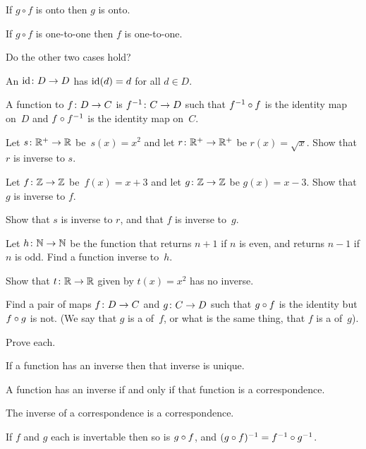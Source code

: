 \documentclass{ibl}
\begin{document}
\begin{ex} 
\begin{exes}
\item If $g\circ f$ is onto then $g$ is onto.
\item If $g\circ f$ is one-to-one then $f$ is one-to-one.
\item Do the other two cases hold?     
\end{exes}
\end{ex}

\begin{df}
An  $\mbox{$\operatorname{id}\colon D\to D$}$ has
$\operatorname{id}(d)=d$ for all $d\in D$.
\end{df}

\begin{df}
A function  to $\mbox{$f\colon D\to C$}$ is 
$\mbox{$f^{-1}\colon C\to D$}$ such that 
$f^{-1}\mathbin{\circ} f$ is the identity map on~$D$ and
$f\mathbin{\circ} f^{-1}$ is the identity map on~$C$.
\end{df}

\begin{ex} 
\begin{exes}
\item Let $\mbox{$s\colon \mathbb{R}^+\to \mathbb{R}$}$ be~$s(x)=x^2$ and let
  $\mbox{$r\colon \mathbb{R}^+\to \mathbb{R}^+$}$ be $r(x)=\sqrt{x}$.
  Show that $r$ is inverse to $s$.    
\item Let $\mbox{$f\colon \mathbb{Z}\to \mathbb{Z}$}$ be~$f(x)=x+3$ and let
  $\mbox{$g\colon \mathbb{Z}\to \mathbb{Z}$}$ be $g(x)=x-3$.
  Show that $g$ is inverse to $f$.
\item Show that $s$ is inverse to $r$, and that $f$ is inverse to~$g$.
\item Let $\mbox{$h\colon \mathbb{N}\to \mathbb{N}$}$ be the function that returns
  $n+1$ if $n$ is even, and returns $n-1$ if $n$ is odd.
  Find a function inverse to~$h$.
\item Show that $\mbox{$t\colon \mathbb{R}\to \mathbb{R}$}$ given by $t(x)=x^2$
  has no inverse.
\end{exes}
\end{ex}

\begin{ex}
  Find a pair of maps $\mbox{$f\colon D\to C$}$ and $\mbox{$g\colon C\to D$}$
  such that $g\mathbin{\circ} f$ is the identity but $f\mathbin{\circ} g$
  is not.
  (We say that $g$ is a  of~$f$, or what is the
  same thing, that $f$ is a  of~$g$).
\end{ex}

\begin{ex} Prove each.
\begin{exes}
\item If a function has an inverse then that inverse
  is unique.
\item A function has an inverse if and only if that 
  function is a correspondence.
\item The inverse of a correspondence is a correspondence.  
\item If $f$ and $g$ each is invertable then so is 
  $g\mathbin{\circ} f$, and $(g\mathbin{\circ} f)^{-1}=f^{-1}\mathbin{\circ} g^{-1}$.
\end{exes}  
\end{ex}
\end{document}
